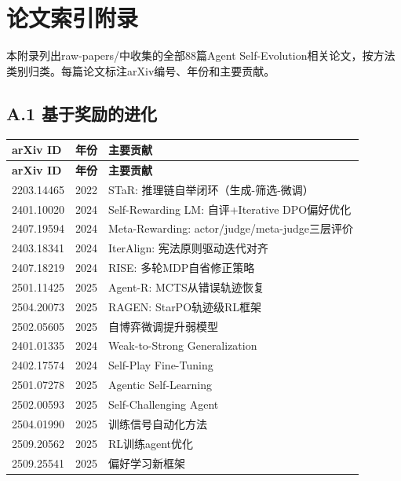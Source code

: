 \section{论文索引附录}
\label{app:papers}

本附录列出raw-papers/中收集的全部88篇Agent Self-Evolution相关论文，按方法类别归类。每篇论文标注arXiv编号、年份和主要贡献。

\subsection*{A.1 基于奖励的进化}

\begin{longtable}{llp{7cm}}
\toprule
\textbf{arXiv ID} & \textbf{年份} & \textbf{主要贡献} \\
\midrule
\endfirsthead
\toprule
\textbf{arXiv ID} & \textbf{年份} & \textbf{主要贡献} \\
\midrule
\endhead
2203.14465 & 2022 & STaR: 推理链自举闭环（生成-筛选-微调） \\
2401.10020 & 2024 & Self-Rewarding LM: 自评+Iterative DPO偏好优化 \\
2407.19594 & 2024 & Meta-Rewarding: actor/judge/meta-judge三层评价 \\
2403.18341 & 2024 & IterAlign: 宪法原则驱动迭代对齐 \\
2407.18219 & 2024 & RISE: 多轮MDP自省修正策略 \\
2501.11425 & 2025 & Agent-R: MCTS从错误轨迹恢复 \\
2504.20073 & 2025 & RAGEN: StarPO轨迹级RL框架 \\
2502.05605 & 2025 & 自博弈微调提升弱模型 \\
2401.01335 & 2024 & Weak-to-Strong Generalization \\
2402.17574 & 2024 & Self-Play Fine-Tuning \\
2501.07278 & 2025 & Agentic Self-Learning \\
2502.00593 & 2025 & Self-Challenging Agent \\
2504.01990 & 2025 & 训练信号自动化方法 \\
2509.20562 & 2025 & RL训练agent优化 \\
2509.25541 & 2025 & 偏好学习新框架 \\
\bottomrule
\end{longtable}

